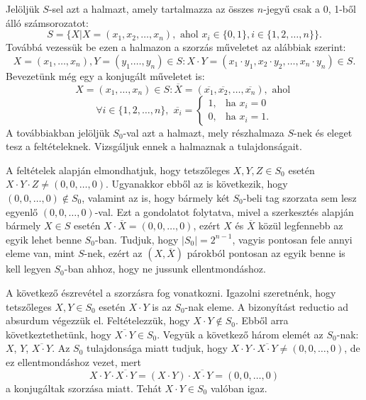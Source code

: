 \begin{solution}
	Jelöljük $S$-sel azt a halmazt, amely tartalmazza az összes $n$-jegyű
	csak a 0, 1-ből álló számsorozatot: 
	\[
	S=\{X|X=(x_{1},x_{2},\dots,x_{n}),\textrm{ ahol }x_{i}\in\{0,1\},i\in\{1,2,\dots,n\}\}.
	\]
	Továbbá vezessük be ezen a halmazon a szorzás műveletet az alábbiak
	szerint: 
	\[
	X=(x_{1},\dots,x_{n}),Y=(y_{1}.\dots,y_{n})\in S:X\cdot Y=(x_{1}\cdot y_{1},x_{2}\cdot y_{2},\dots,x_{n}\cdot y_{n})\in S.
	\]
	Bevezetünk még egy a konjugált műveletet is: 
	\[
	X=(x_{1},\dots,x_{n})\in S:\overline{X}=(\overline{x_{1}},\overline{x_{2}},\dots,\overline{x_{n}}),\textrm{ ahol }
	\]
	\[
	\forall i\in\{1,2,\dots,n\},\phantom{i}\overline{x_{i}}=\left\{ \begin{array}{ll}
		1, & \textrm{ha }x_{i}=0\\
		0, & \textrm{ha }x_{i}=1.
	\end{array}\right.
	\]
	A továbbiakban jelöljük $S_{0}$-val azt a halmazt, mely részhalmaza
	$S$-nek és eleget tesz a feltételeknek. Vizsgáljuk ennek a halmaznak
	a tulajdonságait.
	
	A feltételek alapján elmondhatjuk, hogy tetszőleges $X,Y,Z\in S_{0}$
	esetén $X\cdot Y\cdot Z\neq(0,0,\dots,0)$. Ugyanakkor ebből az is
	következik, hogy $(0,0,\dots,0)\notin S_{0}$, valamint az is, hogy
	bármely két $S_{0}$-beli tag szorzata sem lesz egyenlő $(0,0,\dots,0)$-val.
	Ezt a gondolatot folytatva, mivel a szerkesztés alapján bármely $X\in S$
	esetén $X\cdot\overline{X}=(0,0,\dots,0)$, ezért $X$ és $\overline{X}$
	közül legfennebb az egyik lehet benne $S_{0}$-ban. Tudjuk, hogy $|S_{0}|=2^{n-1}$,
	vagyis pontosan fele annyi eleme van, mint $S$-nek, ezért az $(X,\overline{X})$
	párokból pontosan az egyik benne is kell legyen $S_{0}$-ban ahhoz,
	hogy ne jussunk ellentmondáshoz.
	
	A következő észrevétel a szorzásra fog vonatkozni. Igazolni szeretnénk,
	hogy tetszőleges $X,Y\in S_{0}$ esetén $X\cdot Y$ is az $S_{0}$-nak
	eleme. A bizonyítást reductio ad absurdum végezzük el. Feltételezzük,
	hogy $X\cdot Y\notin S_{0}$. Ebből arra következtethetünk, hogy $\overline{X\cdot Y}\in S_{0}$.
	Vegyük a következő három elemét az $S_{0}$-nak: $X$, $Y$, $\overline{X\cdot Y}$.
	Az $S_{0}$ tulajdonsága miatt tudjuk, hogy $X\cdot Y\cdot\overline{X\cdot Y}\neq(0,0,\dots,0)$,
	de ez ellentmondáshoz vezet, mert 
	\[
	X\cdot Y\cdot\overline{X\cdot Y}=(X\cdot Y)\cdot\overline{X\cdot Y}=(0,0,\dots,0)
	\]
	a konjugáltak szorzása miatt. Tehát $X\cdot Y\in S_{0}$ valóban igaz.
	

\end{solution}
